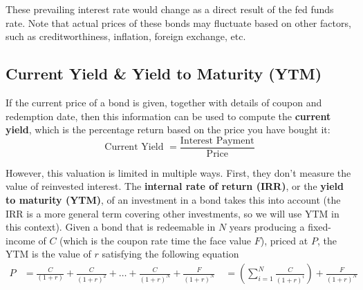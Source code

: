 \documentclass{article}
\begin{document}
    These prevailing interest rate would change as a direct result of the fed funds rate. Note that actual prices of these bonds may fluctuate based on other factors, such as creditworthiness, inflation, foreign exchange, etc.

  \subsection{Current Yield \& Yield to Maturity (YTM)}

    If the current price of a bond is given, together with details of coupon and redemption date, then this information can be used to compute the \textbf{current yield}, which is the percentage return based on the price you have bought it:
    \begin{equation}
      \text{Current Yield } = \frac{\text{Interest Payment}}{\text{Price}}
    \end{equation}

    However, this valuation is limited in multiple ways. First, they don't measure the value of reinvested interest. The \textbf{internal rate of return (IRR)}, or the \textbf{yield to maturity (YTM)}, of an investment in a bond takes this into account (the IRR is a more general term covering other investments, so we will use YTM in this context). Given a bond that is redeemable in $N$ years producing a fixed-income of $C$ (which is the coupon rate time the face value $F$), priced at $P$, the YTM is the value of $r$ satisfying the following equation
    \begin{align*}
      P & = \frac{C}{(1+r)} + \frac{C}{(1+r)^2} + \ldots + \frac{C}{(1+r)^{N}} + \frac{F}{(1+r)^N} \
      & = \left(\sum_{i=1}^N \frac{C}{(1+r)^i} \right) + \frac{F}{(1+r)^N}
    \end{align*}
\end{document}
